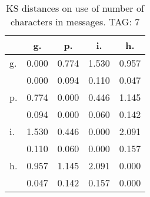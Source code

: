 \begin{table}[h!]
\begin{center}
\begin{tabular}{| l | c | c | c | c |}\hline
 & g. & p. & i. & h. \\\hline
g. & 0.000  & 0.774  & 1.530  & 0.957 \\\hline
 & 0.000  & 0.094  & 0.110  & 0.047 \\\hline
p. & 0.774  & 0.000  & 0.446  & 1.145 \\\hline
 & 0.094  & 0.000  & 0.060  & 0.142 \\\hline
i. & 1.530  & 0.446  & 0.000  & 2.091 \\\hline
 & 0.110  & 0.060  & 0.000  & 0.157 \\\hline
h. & 0.957  & 1.145  & 2.091  & 0.000 \\\hline
 & 0.047  & 0.142  & 0.157  & 0.000 \\\hline
\end{tabular}
\caption{KS distances on use of number of characters in messages. TAG: 7}
\end{center}
\end{table}